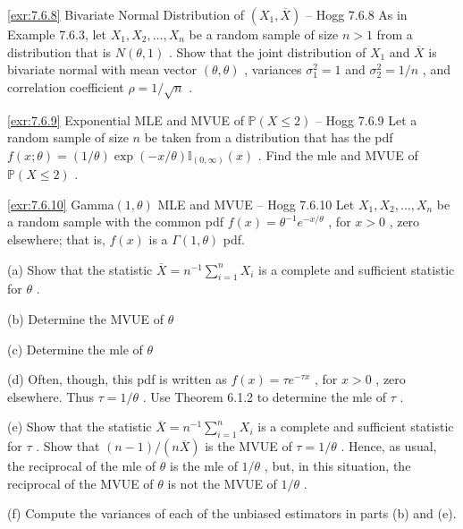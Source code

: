 \begin{exercise}{\ref{exr:7.6.8} Bivariate Normal Distribution of $(X_{1}, \overline{X})$ – Hogg 7.6.8}\label{exr:7.6.8}
As in Example 7.6.3, let $X_{1}, X_{2}, \ldots, X_{n}$ be a random sample of size $n > 1$ from a distribution that is $N(\theta, 1)$ . Show that the joint distribution of $X_{1}$ and $\overline{X}$ is bivariate normal with mean vector $(\theta, \theta)$ , variances $\sigma_{1}^{2} = 1$ and $\sigma_{2}^{2} = 1/n$ , and correlation coefficient $\rho = 1/\sqrt{n}$ .
\end{exercise}

\begin{exercise}{\ref{exr:7.6.9} Exponential MLE and MVUE of $\mathbb{P}(X \leq 2)$ – Hogg 7.6.9}\label{exr:7.6.9}
Let a random sample of size $n$ be taken from a distribution that has the pdf $f(x; \theta) = (1 / \theta) \exp(-x / \theta) \mathbb{I}_{(0, \infty)}(x)$ . Find the mle and MVUE of $\mathbb{P}(X \leq 2)$ .
\end{exercise}

\begin{exercise}{\ref{exr:7.6.10} Gamma$(1, \theta)$ MLE and MVUE – Hogg 7.6.10}\label{exr:7.6.10}
Let $X_1, X_2, \ldots, X_n$ be a random sample with the common pdf $f(x) = \theta^{-1} e^{-x / \theta}$ , for $x > 0$ , zero elsewhere; that is, $f(x)$ is a $\Gamma(1, \theta)$ pdf.

(a) Show that the statistic $\overline{X} = n^{-1}\sum_{i=1}^{n} X_i$ is a complete and sufficient statistic for $\theta$ .

(b) Determine the MVUE of $\theta$

(c) Determine the mle of $\theta$

(d) Often, though, this pdf is written as $f(x) = \tau e^{-\tau x}$ , for $x > 0$ , zero elsewhere. Thus $\tau = 1 / \theta$ . Use Theorem 6.1.2 to determine the mle of $\tau$ .

(e) Show that the statistic $\overline{X} = n^{-1}\sum_{i=1}^{n} X_i$ is a complete and sufficient statistic for $\tau$ . Show that $(n-1)/(n\overline{X})$ is the MVUE of $\tau = 1/\theta$ . Hence, as usual, the reciprocal of the mle of $\theta$ is the mle of $1/\theta$ , but, in this situation, the reciprocal of the MVUE of $\theta$ is not the MVUE of $1/\theta$ .

(f) Compute the variances of each of the unbiased estimators in parts (b) and (e).
\end{exercise}

